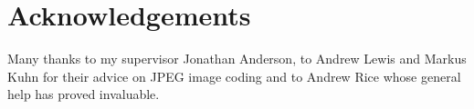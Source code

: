 
\bigskip

\begingroup
\let\clearpage\relax
\let\cleardoublepage\relax
\let\cleardoublepage\relax
\chapter*{Acknowledgements}

Many thanks to my supervisor Jonathan Anderson, to Andrew Lewis and Markus Kuhn for their advice on JPEG image coding and to Andrew Rice whose general help has proved invaluable.


\endgroup